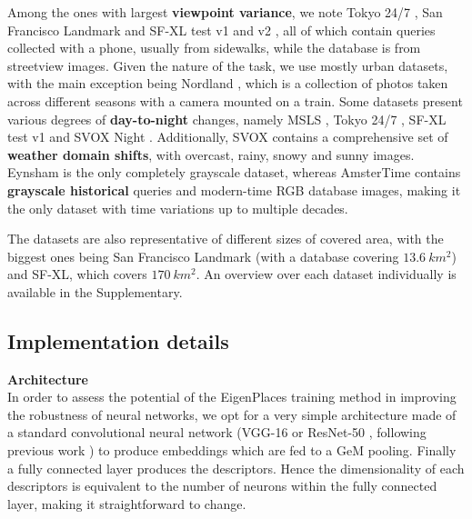 \documentclass[10pt,twocolumn,letterpaper]{article}
\newcommand{\myparagraph}[1]{\vspace{4pt}\noindent\textbf{#1}}
\begin{document}
Among the ones with largest \textbf{viewpoint variance}, we note Tokyo 24/7 \cite{Torii_2018_tokyo247}, San Francisco Landmark \cite{Chen_2011_san_francisco} and SF-XL test v1 and v2 \cite{Berton_2022_cosPlace}, all of which contain queries collected with a phone, usually from sidewalks, while the database is from streetview images.
Given the nature of the task, we use mostly urban datasets, with the main exception being Nordland \cite{Sunderhauf_2013_nordland}, which is a collection of photos taken across different seasons with a camera mounted on a train.
Some datasets present various degrees of \textbf{day-to-night} changes, namely MSLS \cite{Warburg_2020_msls}, Tokyo 24/7 \cite{Torii_2018_tokyo247}, SF-XL test v1 \cite{Berton_2022_cosPlace} and SVOX Night \cite{Berton_2021_svox}.
Additionally, SVOX contains a comprehensive set of \textbf{weather domain shifts}, with overcast, rainy, snowy and sunny images.
Eynsham \cite{Cummins_2009_eynsham} is the only completely grayscale dataset, whereas AmsterTime \cite{Yildiz_2022_AmsterTime} contains \textbf{grayscale historical} queries and modern-time RGB database images, making it the only dataset with time variations up to multiple decades.

The datasets are also representative of different sizes of covered area, with the biggest ones being San Francisco Landmark \cite{Chen_2011_san_francisco} (with a database covering $13.6 ~km^{2}$) and SF-XL, which covers $170 ~km^2$.
An overview over each dataset individually is available in the Supplementary.



\subsection{Implementation details}

\myparagraph{Architecture} \\
In order to assess the potential of the EigenPlaces training method in improving the robustness of neural networks, we opt for a very simple architecture made of a standard convolutional neural network (VGG-16 \cite{Simonyan_2015_vgg} or ResNet-50 \cite{He_2016_resnet}, following previous work \cite{Arandjelovic_2018_netvlad, Kim_2017_crn, Liu_2019_sare, Ge_2020_sfrs, Berton_2022_cosPlace, Alibey_2022_gsvcities, Alibey_2023_mixvpr}) to produce embeddings which are fed to a GeM \cite{Radenovic_2019_gem} pooling. Finally a fully connected layer produces the descriptors.
Hence the dimensionality of each descriptors is  equivalent to the number of neurons within the fully connected layer, making it straightforward to change.
\end{document}
